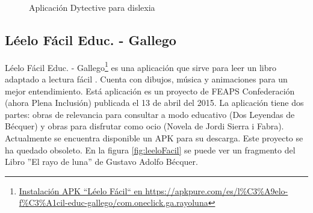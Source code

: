 \begin{figure}[h]
	\centering

	\caption{Aplicación Dytective para dislexia}
	\label{fig:dytective}
\end{figure}

\subsection{Léelo Fácil Educ. - Gallego }
Léelo Fácil Educ. - Gallego\footnote{\href{https://apkpure.com/es/l\%C3\%A9elo-f\%C3\%A1cil-educ-gallego/com.oneclick.ga.rayoluna}{Instalación APK ``Léelo Fácil`` en https://apkpure.com/es/l\%C3\%A9elo-f\%C3\%A1cil-educ-gallego/com.oneclick.ga.rayoluna}} es una aplicación que sirve para leer un libro adaptado a lectura fácil . Cuenta con dibujos, música y animaciones para un mejor entendimiento. Está aplicación es un proyecto de FEAPS Confederación (ahora Plena Inclusión) publicada el 13 de abril del 2015. La aplicación tiene dos partes: obras de relevancia para consultar a modo educativo (Dos Leyendas de Bécquer) y obras para disfrutar como ocio (Novela de Jordi Sierra i Fabra). Actualmente se encuentra disponible un APK para su descarga. Este proyecto se ha quedado obsoleto. En la figura \ref{fig:leeloFacil} se puede ver un fragmento del Libro ''El rayo de luna'' de Gustavo Adolfo Bécquer.

